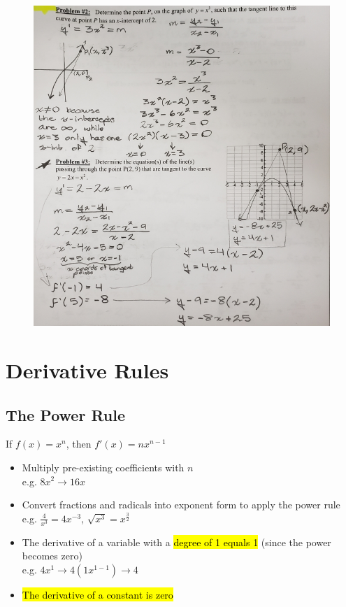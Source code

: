 \documentclass[a4paper,12pt]{article}
\begin{document}
\begin{figure}[H]
    \centering
    \includegraphics[width=\textwidth]{point}
\end{figure}

\section{Derivative Rules}

\subsection{The Power Rule}
\begin{center}
If $f(x) = x^n$, then $f'(x) = nx^{n-1}$
\end{center}
\begin{itemize}
    \item{Multiply pre-existing coefficients with $n$ \\ e.g. $8x^2 \longrightarrow 16x$}
    \item{Convert fractions and radicals into exponent form to apply the power rule \\ e.g. $\frac{4}{x^3} = 4x^{-3}$, $\sqrt{x^3} = x^{\frac{3}{2}}$}
    \item{The derivative of a variable with a \hl{degree of 1 equals 1} (since the power becomes zero) \\ e.g. $4x^1 \longrightarrow 4(1x^{1-1}) \longrightarrow 4$}
    \item{\hl{The derivative of a constant is zero}}
\end{itemize}
\end{document}
